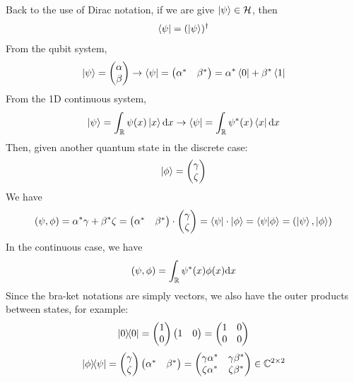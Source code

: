 \par
Back to the use of Dirac notation, if we are give $\ket{\psi} \in \mathcal{H}$, then
$$\bra{\psi} = (\ket{\psi})^{\dagger}$$
From the qubit system,
$$\ket{\psi} = \begin{pmatrix}
    \alpha \\ \beta
\end{pmatrix} \to \bra{\psi} = \begin{pmatrix}
    \alpha^{*} & \beta^{*}
\end{pmatrix} = \alpha^{*}\bra{0} + \beta^{*}\bra{1}$$
From the 1D continuous system,
$$\ket{\psi} = \int_{\mathbb{R}} \psi(x)\ket{x} \dd x \to \bra{\psi} = \int_{\mathbb{R}} \psi^{*}(x)\bra{x} \dd x$$
Then, given another quantum state in the discrete case:
$$\ket{\phi} = \begin{pmatrix}
    \gamma \\ \zeta
\end{pmatrix}$$
We have
$$(\psi, \phi) = \alpha^{*}\gamma + \beta^{*}\zeta = \begin{pmatrix}
    \alpha^{*} & \beta^{*}
\end{pmatrix} \cdot \begin{pmatrix}
    \gamma \\ \zeta
\end{pmatrix} = \bra{\psi} \cdot \ket{\phi} = \braket{\psi}{\phi} = (\ket{\psi}, \ket{\phi})$$
In the continuous case, we have
$$(\psi, \phi) = \int_{\mathbb{R}} \psi^{*}(x)\phi(x) \dd x$$
Since the bra-ket notations are simply vectors, we also have the outer products between states, for example:
$$\dyad{0}{0} = \begin{pmatrix}
    1 \\ 0
\end{pmatrix} \begin{pmatrix}
    1 & 0
\end{pmatrix} = \begin{pmatrix}
    1 & 0 \\
    0 & 0
\end{pmatrix}$$
$$\dyad{\phi}{\psi} = \begin{pmatrix}
    \gamma \\ \zeta
\end{pmatrix}\begin{pmatrix}
    \conj{\alpha} & \conj{\beta}
\end{pmatrix} = \begin{pmatrix}
    \gamma\conj{\alpha} & \gamma\conj{\beta} \\
    \zeta\conj{\alpha} & \zeta\conj{\beta}
\end{pmatrix} \in \C^{2 \times 2}$$
